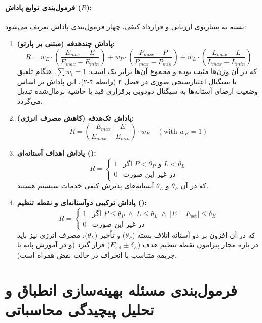 \documentclass[oneside,openany,phd]{TMU-Thesis}
\begin{document}
\paragraph{فرمول‌بندی توابع پاداش ($R$):}
بسته به سناریوی ارزیابی و قرارداد کیفی، چهار فرمول‌بندی پاداش تعریف می‌شود:
\begin{enumerate}
    \item \textbf{پاداش چندهدفه (مبتنی بر پارتو):}
    $$R = w_E \cdot \left(\frac{E_{max} - E}{E_{max} - E_{min}}\right) + w_P \cdot \left(\frac{P_{max} - P}{P_{max} - P_{min}}\right) + w_L \cdot \left(\frac{L_{max} - L}{L_{max} - L_{min}}\right)$$
    که در آن وزن‌ها مثبت بوده و مجموع آن‌ها برابر یک است: $\sum w_i = 1$. هنگام تلفیق با سیگنال اعتبارسنجی صوری  در فصل ۴ (رابطه ۴-۲)، این پاداش بر اساس وضعیت ارضای آستانه‌ها به سیگنال دودویی برقراری قید یا حاشیه نرمال‌شده تبدیل می‌گردد.
    \item \textbf{پاداش تک‌هدفه (کاهش مصرف انرژی):}
    $$R = \left(\frac{E_{max} - E}{E_{max} - E_{min}}\right) \cdot w_E \quad (\text{with } w_E = 1)$$
    \item \textbf{پاداش اهداف آستانه‌ای ():}
    $$R = \begin{cases} 
    1 & \text{اگر } P < \theta_P \text{ و } L < \theta_L \\
    0 & \text{در غیر این صورت}
    \end{cases}$$
    که در آن $\theta_P$ و $\theta_L$ آستانه‌های پذیرش کیفی خدمات سیستم هستند.
    \item \textbf{پاداش ترکیبی دوآستانه‌ای و نقطه تنظیم ():}
    $$R = \begin{cases} 
    1 & \text{اگر } P \le \theta_P \;\land\; L \le \theta_L \;\land\; |E - E_{\text{set}}| \le \delta_E \\
    0 & \text{در غیر این صورت}
    \end{cases}$$
    که در آن افزون بر دو آستانه اتلاف بسته ($\theta_P$) و تأخیر ($\theta_L$)، مصرف انرژی نیز باید در بازه مجاز پیرامون نقطه تنظیم هدف ($E_{\text{set}} \pm \delta_E$) قرار گیرد (و در آموزش پایه با جریمه متناسب با انحراف در حالت نقض همراه است).
\end{enumerate}

\section{فرمول‌بندی مسئله بهینه‌سازی انطباق و تحلیل پیچیدگی محاسباتی}
\label{sec:ch2_optimization_complexity}
\end{document}
